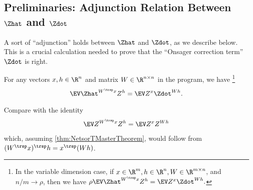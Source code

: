 \documentclass[main.tex]{subfiles}
\begin{document}
\subsection{Preliminaries: Adjunction Relation Between \texorpdfstring{$\Zhat$}{Z hat} and \texorpdfstring{$\Zdot$}{Z check}}
A sort of ``adjunction'' holds between $\Zhat$ and $\Zdot$, as we describe below.
This is a crucial calculation needed to prove that the ``Onsager correction term'' $\Zdot$ is right.
\begin{lemma}\label{lemma:DtrxAdjunction}
For any vectors $x, h \in \R^n$ and matrix $W\in \R^{n\times n}$ in the program, we have%
\footnote{
  In the variable dimension case, if $x \in \R^m, h \in \R^n, W \in \R^{m \times n}$, and $n/m \to \rho$, then we have
  $\rho \EV \Zhat^{W^\trsp x} Z^h = \EV Z^{x} \Zdot^{Wh}.$
}
\begin{align*}
  \EV \Zhat^{W^\trsp x} Z^h = \EV Z^{x} \Zdot^{Wh}.
\end{align*}
\end{lemma}
Compare with the identity
\[\EV Z^{W^\trsp x} Z^h = \EV Z^x Z^{Wh}\]
which, assuming \cref{thm:NetsorTMasterTheorem}, would follow from $(W^\trsp x)^\trsp h = x^\trsp (Wh)$.
\end{document}
